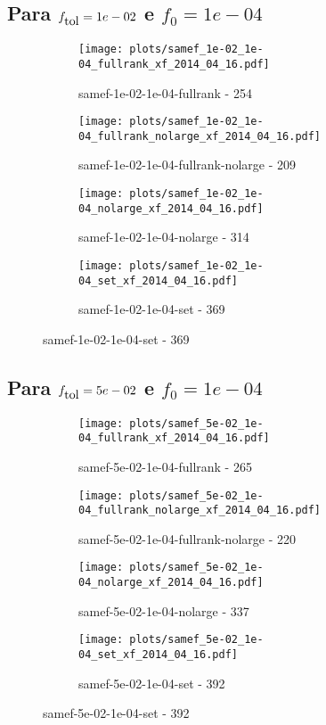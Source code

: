 \newpage
\subsection{Para $f_{\mbox{tol}} = 1e-02$ e $f_0 = 1e-04$}

\begin{figure}[H]
  \centering
  \begin{subfigure}{0.48\textwidth}
    \texttt{[image: plots/samef\_1e-02\_1e-04\_fullrank\_xf\_2014\_04\_16.pdf]}
    \caption{samef-1e-02-1e-04-fullrank - 254}
  \end{subfigure}
  \begin{subfigure}{0.48\textwidth}
    \texttt{[image: plots/samef\_1e-02\_1e-04\_fullrank\_nolarge\_xf\_2014\_04\_16.pdf]}
    \caption{samef-1e-02-1e-04-fullrank-nolarge - 209}
  \end{subfigure}
  \begin{subfigure}{0.48\textwidth}
    \texttt{[image: plots/samef\_1e-02\_1e-04\_nolarge\_xf\_2014\_04\_16.pdf]}
    \caption{samef-1e-02-1e-04-nolarge - 314}
  \end{subfigure}
  \begin{subfigure}{0.48\textwidth}
    \texttt{[image: plots/samef\_1e-02\_1e-04\_set\_xf\_2014\_04\_16.pdf]}
    \caption{samef-1e-02-1e-04-set - 369}
  \end{subfigure}
\end{figure}

\newpage
\subsection{Para $f_{\mbox{tol}} = 5e-02$ e $f_0 = 1e-04$}

\begin{figure}[H]
  \centering
  \begin{subfigure}{0.48\textwidth}
    \texttt{[image: plots/samef\_5e-02\_1e-04\_fullrank\_xf\_2014\_04\_16.pdf]}
    \caption{samef-5e-02-1e-04-fullrank - 265}
  \end{subfigure}
  \begin{subfigure}{0.48\textwidth}
    \texttt{[image: plots/samef\_5e-02\_1e-04\_fullrank\_nolarge\_xf\_2014\_04\_16.pdf]}
    \caption{samef-5e-02-1e-04-fullrank-nolarge - 220}
  \end{subfigure}
  \begin{subfigure}{0.48\textwidth}
    \texttt{[image: plots/samef\_5e-02\_1e-04\_nolarge\_xf\_2014\_04\_16.pdf]}
    \caption{samef-5e-02-1e-04-nolarge - 337}
  \end{subfigure}
  \begin{subfigure}{0.48\textwidth}
    \texttt{[image: plots/samef\_5e-02\_1e-04\_set\_xf\_2014\_04\_16.pdf]}
    \caption{samef-5e-02-1e-04-set - 392}
  \end{subfigure}
\end{figure}

